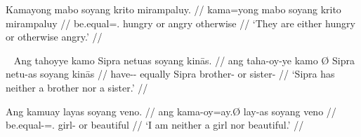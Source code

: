 \a\label{ex:eitherorpred}\begingl
	\gla Kamayong mabo soyang krito mirampaluy. //
	\glb kama=yong mabo soyang krito mirampaluy //
	\glc be.equal=\TsgN{}.\Aarg{} hungry or angry otherwise //
	\glft `They are either hungry or otherwise angry.' //
\endgl

\xe

\pex~\label{ex:neithernor}
\a\label{ex:neithernorvb}\begingl
	\gla Ang tahoyye kamo {} Sipra netuas soyang kinās. //
	\glb ang taha-oy-ye kamo Ø Sipra netu-as soyang kinās //
	\glc \AgtT{} have-\Neg{}-\TsgF{} equally \Top{} Sipra brother-\Parg{} 
		or sister-\Parg{} //
	\glft `Sipra has neither a brother nor a sister.' //
\endgl

\a\label{ex:neithernorpred}\begingl
	\gla Ang kamuay layas soyang veno. //
	\glb ang kama-oy=ay.Ø lay-as soyang veno //
	\glc \AgtT{} be.equal-\Neg{}=\Fsg{}.\Aarg{} girl-\Parg{} or beautiful //
	\glft `I am neither a girl nor beautiful.' //
\endgl

\xe


